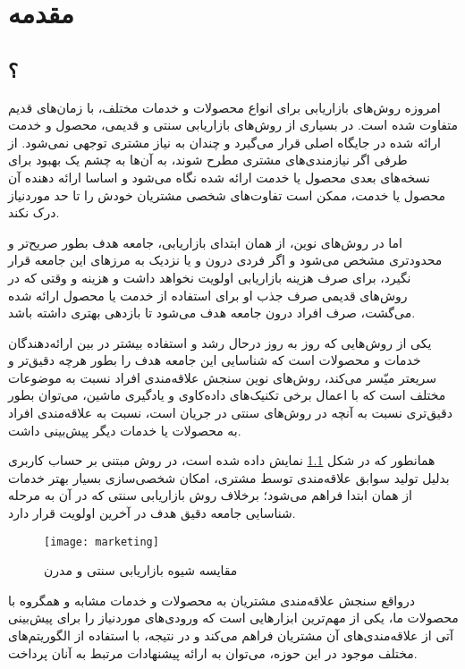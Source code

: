 
\chapter{مقدمه}

\section{؟}

امروزه روش‌های بازاریابی برای انواع محصولات و خدمات مختلف،‌ با زمان‌های قدیم متفاوت شده است. در بسیاری از روش‌های بازاریابی سنتی و قدیمی، محصول و خدمت ارائه شده در جایگاه اصلی قرار می‌گیرد و چندان به نیاز مشتری توجهی نمی‌شود. از طرفی اگر نیازمندی‌های مشتری مطرح شوند، به آن‌ها به چشم یک بهبود برای نسخه‌های بعدی محصول یا خدمت ارائه شده نگاه می‌شود و اساسا ارائه دهنده آن محصول یا خدمت، ممکن است تفاوت‌های شخصی مشتریان خودش را تا حد موردنیاز درک نکند\cite{marketing2}.

اما در روش‌های نوین، از همان ابتدای بازاریابی، جامعه هدف بطور صریح‌تر و محدودتری مشخص می‌شود و اگر فردی درون و یا نزدیک به مرزهای این جامعه قرار نگیرد، برای صرف هزینه بازاریابی اولویت نخواهد داشت و هزینه و وقتی که در روش‌های قدیمی صرف جذب او برای استفاده از خدمت یا محصول ارائه شده می‌گشت، صرف افراد درون جامعه هدف می‌شود تا بازدهی بهتری داشته باشد.

یکی از روش‌هایی که روز به روز درحال رشد و استفاده بیشتر در بین ارائه‌دهندگان خدمات و محصولات است که شناسایی این جامعه هدف را بطور هرچه دقیق‌تر و سریعتر میّسر می‌کند، روش‌های نوین سنجش علاقه‌مندی افراد نسبت به موضوعات مختلف است که با اعمال برخی تکنیک‌های داده‌کاوی و یادگیری ماشین،  می‌توان بطور دقیق‌تری نسبت به آنچه در روش‌های سنتی در جریان است، نسبت به علاقه‌مندی افراد به محصولات یا خدمات دیگر پیش‌بینی داشت\cite{marketing3}.

همانطور که در شکل
\cref{fig.1}
نمایش داده شده است، در روش مبتنی بر حساب کاربری بدلیل تولید سوابق علاقه‌مندی توسط مشتری، امکان شخصی‌سازی بسیار بهتر خدمات از همان ابتدا فراهم می‌شود؛ برخلاف روش بازاریابی سنتی که در آن به مرحله شناسایی جامعه دقیق هدف در آخرین اولویت قرار دارد.\\

\begin{figure}[H]
	\centering\texttt{[image: marketing]}
	\caption{مقایسه شیوه بازاریابی سنتی و مدرن\cite{marketingimage}}\label{fig.1}
\end{figure}
\newpage

درواقع سنجش علاقه‌مندی مشتریان به محصولات و خدمات مشابه و همگروه با محصولات ما، یکی از مهم‌ترین ابزارهایی است که ورودی‌های موردنیاز را برای پیش‌بینی آتی از علاقه‌مندی‌های آن مشتریان فراهم می‌کند و در نتیجه، با استفاده از الگوریتم‌های مختلف موجود در این حوزه، می‌توان به ارائه پیشنهادات مرتبط به آنان پرداخت.\\

